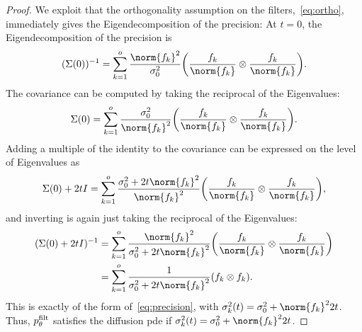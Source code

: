 \begin{proof}
	We exploit that the orthogonality assumption on the filters,~\eqref{eq:ortho}, immediately gives the Eigendecomposition of the precision:
	At \( t = \num{0} \), the Eigendecomposition of the precision is
	\begin{equation}
		(\Sigma(\num{0}))^{-1} = \sum_{k=\num{1}}^\NumExperts \frac{\norm{\Filter_k}^{2}}{\sigma_{\num{0}}^{\num{2}}} \biggl(\frac{\Filter_k}{\norm{\Filter_k}} \otimes \frac{\Filter_k}{\norm{\Filter_k}} \biggr).
	\end{equation}
	The covariance can be computed by taking the reciprocal of the Eigenvalues:
	\begin{equation}
		\Sigma(\num{0}) = \sum_{k=\num{1}}^\NumExperts \frac{\sigma_{\num{0}}^{\num{2}}}{\norm{\Filter_k}^{2}} \biggl(\frac{\Filter_k}{\norm{\Filter_k}} \otimes \frac{\Filter_k}{\norm{\Filter_k}}\biggr).
	\end{equation}
	Adding a multiple of the identity to the covariance can be expressed on the level of Eigenvalues as
	\begin{equation}
		\Sigma(\num{0}) + \num{2}t\Identity = \sum_{k=\num{1}}^\NumExperts \frac{\sigma_{\num{0}}^{\num{2}} + \num{2}t\norm{\Filter_k}^{2}}{\norm{\Filter_k}^{2}} \biggl(\frac{\Filter_k}{\norm{\Filter_k}} \otimes \frac{\Filter_k}{\norm{\Filter_k}}\biggr),
	\end{equation}
	and inverting is again just taking the reciprocal of the Eigenvalues:
	\begin{equation}
		\begin{aligned}
			(\Sigma(\num{0}) + \num{2}t\Identity)^{-1} &= \sum_{k=\num{1}}^\NumExperts \frac{\norm{\Filter_k}^{2}}{\sigma_{\num{0}}^{\num{2}} + \num{2}t\norm{\Filter_k}^{2}} \biggl(\frac{\Filter_k}{\norm{\Filter_k}} \otimes \frac{\Filter_k}{\norm{\Filter_k}}\biggr) \\
												 &= \sum_{k=\num{1}}^\NumExperts \frac{1}{\sigma_{\num{0}}^{\num{2}} + \num{2}t\norm{\Filter_k}^{{\num{2}}}} (\Filter_k \otimes \Filter_k).
		\end{aligned}
		\label{eq:prec diff undercomplete}
	\end{equation}
	This is exactly of the form of~\cref{eq:precision}, with \( \sigma_k^{\num{2}}(t) = \sigma_{\num{0}}^{\num{2}} + \norm{\Filter_k}^{\num{2}} \num{2}t \).
	Thus, \( p^{\mathrm{filt}}_\theta \) satisfies the diffusion \gls{pde} if \( \sigma_k^{\num{2}}(t) = \sigma_{\num{0}}^{\num{2}} + \norm{\Filter_k}^{\num{2}} \num{2}t \).
\end{proof}

